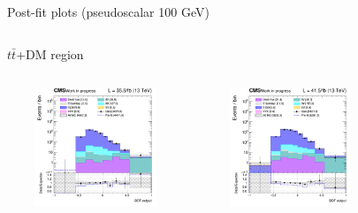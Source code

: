 \documentclass[8pt]{beamer}
\begin{document}
\begin{frame}{Post-fit plots (pseudoscalar 100 GeV)}
\vspace{-8pt}
\begin{columns}
\begin{column}{1.09\textwidth}
\begin{block}{\centering $t \bar t$+DM region}\end{block} \vspace{10pt}
\end{column}
\end{columns} \vspace{-16pt}
\begin{columns}
		\begin{column}{0.33\textwidth}
			\begin{center}
     			\includegraphics[width=1.0\textwidth, height=100pt]{figs/postfits/2016/log_cratio_TTbar_topCR_ll_BDT_ttDM100_TTbar_BDT_output_pseudoscalar100_customBinsAttempt7.png}
    		\end{center}		
		\end{column}
		\begin{column}{0.33\textwidth}
			\begin{center}
     			\includegraphics[width=1.0\textwidth, height=100pt]{figs/postfits/2017/log_cratio_TTbar_topCR_ll_BDT_ttDM100_TTbar_BDT_output_pseudoscalar100_customBinsAttempt7.png}
    		\end{center}		
		\end{column}
		\begin{column}{0.33\textwidth}
			\begin{center}

\end{center}
\end{column}
\end{columns}
\end{frame}
\end{document}
